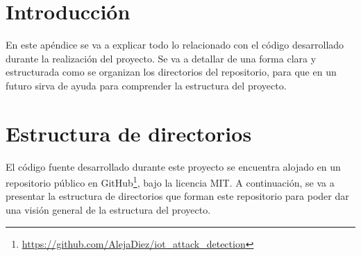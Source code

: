 
\section{Introducción}
\label{sec:ProgramadorIntroduccion}
En este apéndice se va a explicar todo lo relacionado con el código desarrollado durante la realización del proyecto. Se va a detallar de una forma clara y estructurada como se organizan los directorios del repositorio, para que en un futuro sirva de ayuda para comprender la estructura del proyecto.

\section{Estructura de directorios}
\label{sec:EstructuraDirectorios}
El código fuente desarrollado durante este proyecto se encuentra alojado en un repositorio público en GitHub\footnote{\url{https://github.com/AlejaDiez/iot_attack_detection}}, bajo la licencia MIT. A continuación, se va a presentar la estructura de directorios que forman este repositorio para poder dar una visión general de la estructura del proyecto.

